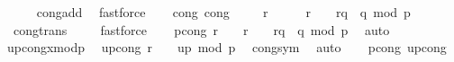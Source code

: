 \begin{isabellebody}
\ \ \ \ \isamarkupfalse%
\ cong{\isacharunderscore}{\kern0pt}add\ \isamarkupfalse%
\ fastforce\isanewline
\ \ \isamarkupfalse%
\ cong{\isacharunderscore}{\kern0pt}{}\ cong{\isacharunderscore}{\kern0pt}{}\ \isanewline
\ \ \isamarkupfalse%
\ {\isachardoublequoteopen}{\isacharbrackleft}{\kern0pt}{\isacharparenleft}{\kern0pt}r\ {\isacharcircum}{\kern0pt}\ {}{\isacharparenright}{\kern0pt}\ {\isacharequal}{\kern0pt}\ {}\ {\isacharplus}{\kern0pt}\ {\isacharparenleft}{\kern0pt}r\ {\isacharcircum}{\kern0pt}\ {}{\isacharparenright}{\kern0pt}\ {\isacharasterisk}{\kern0pt}\ r{\isacharunderscore}{\kern0pt}q\ {\isacharasterisk}{\kern0pt}\ q{\isacharbrackright}{\kern0pt}\ {\isacharparenleft}{\kern0pt}mod\ p{\isacharparenright}{\kern0pt}{\isachardoublequoteclose}\ \isanewline
\ \ \ \ \isamarkupfalse%
\ \ cong{\isacharunderscore}{\kern0pt}trans\isanewline
\ \ \ \isamarkupfalse%
\ fastforce\isanewline
\ \ \isamarkupfalse%
\ p{\isacharunderscore}{\kern0pt}cong{\isacharcolon}{\kern0pt}\ {\isachardoublequoteopen}{\isacharbrackleft}{\kern0pt}{\isacharparenleft}{\kern0pt}r\ {\isacharcircum}{\kern0pt}\ {}{\isacharparenright}{\kern0pt}\ {\isacharequal}{\kern0pt}\ {\isacharparenleft}{\kern0pt}r\ {\isacharcircum}{\kern0pt}\ {}{\isacharparenright}{\kern0pt}\ {\isacharasterisk}{\kern0pt}\ r{\isacharunderscore}{\kern0pt}q\ {\isacharasterisk}{\kern0pt}\ q{\isacharbrackright}{\kern0pt}\ {\isacharparenleft}{\kern0pt}mod\ p{\isacharparenright}{\kern0pt}{\isachardoublequoteclose}\ \isamarkupfalse%
\ auto\isanewline
\ \ \isamarkupfalse%
\ up{\isacharunderscore}{\kern0pt}cong{\isacharunderscore}{\kern0pt}x{\isacharunderscore}{\kern0pt}mod{\isacharunderscore}{\kern0pt}p\ \isamarkupfalse%
\ up{\isacharunderscore}{\kern0pt}cong{\isacharcolon}{\kern0pt}\ {\isachardoublequoteopen}{\isacharbrackleft}{\kern0pt}{\isacharparenleft}{\kern0pt}r\ {\isacharcircum}{\kern0pt}\ {}{\isacharparenright}{\kern0pt}\ {\isacharequal}{\kern0pt}\ {\isacharquery}{\kern0pt}up{\isacharbrackright}{\kern0pt}\ {\isacharparenleft}{\kern0pt}mod\ p{\isacharparenright}{\kern0pt}{\isachardoublequoteclose}\ \isamarkupfalse%
\ cong{\isacharunderscore}{\kern0pt}sym\ \isamarkupfalse%
\ auto\isanewline
\ \ \isamarkupfalse%
\ p{\isacharunderscore}{\kern0pt}cong\ up{\isacharunderscore}{\kern0pt}cong\ \isanewline
\ \ \isamarkupfalse%

\end{isabellebody}
